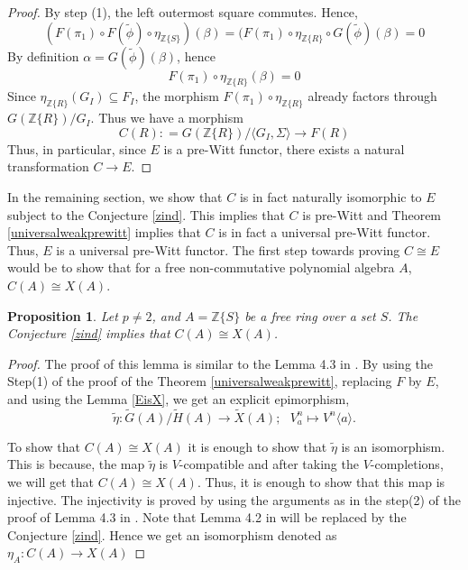 \documentclass[11pt]{amsart}
\theoremstyle{plain}
\newtheorem{proposition}[thm]{Proposition}
\theoremstyle{definition}
\renewcommand{\tilde}{\widetilde}
\newcommand{\Z}{{\mathbb Z}}
\newcommand{\ab}[1]{\langle {#1} \rangle}
\newcommand{\ac}[1]{\{#1\}}
\begin{document}
\begin{proof}
\noindent By step (1), the left outermost square commutes. Hence,
$$(F(\pi_1) \circ F(\tilde{\phi}) \circ \eta_{\Z\{S\}})(\beta) = (F(\pi_1) \circ \eta_{\Z\{R\}} \circ G(\tilde{\phi})(\beta) = 0 $$
By definition $\alpha = G(\tilde{\phi})(\beta)$, hence 
$$F(\pi_1) \circ \eta_{\Z\{R\}}(\beta) = 0 $$
Since $\eta_{\Z\{R\}}(G_I) \subseteq F_I$, the morphism $F(\pi_1) \circ \eta_{\Z\{R\}}$ already factors through $G(\Z\{R\})/G_I$. Thus we have a morphism 
$$C(R) : = G(\Z\{R\})/\langle G_I, \Sigma\rangle \to F(R)$$
Thus, in particular, since $E$ is a pre-Witt functor, there exists a natural transformation $C \to E$. 
\end{proof}

In the remaining section, we show that $C$ is in fact naturally isomorphic to $E$ subject to the Conjecture \ref{zind}. This implies that  $C$ is pre-Witt and Theorem \ref{universalweakprewitt} implies that $C$ is in fact a universal pre-Witt functor. Thus, $E$ is a universal pre-Witt functor. The first step towards proving $C \cong E$ would be to show that for a free non-commutative polynomial algebra $A$, $C(A) \cong X(A)$.  

\begin{proposition}\label{C(A)isX(A)} Let $p \neq 2$, and $A=\Z\ac{S}$ be a free ring over a set $S$. The Conjecture \ref{zind} implies that $C(A) \cong X(A)$. 
\end{proposition}
\begin{proof}
The proof of this lemma is similar to the Lemma 4.3 in \cite{ps}.
\vspace{2mm}
By using the Step(1) of the proof of the Theorem \ref{universalweakprewitt},  replacing $F$ by $E$, and using the Lemma \ref{EisX}, we get an explicit epimorphism, 
$$\tilde{\eta}:  \tilde{G}(A)/\tilde{H}(A) \to \tilde{X}(A);  \  \ \ V^n_a \mapsto V^n\ab{a} .$$
 
To show that $C(A) \cong X(A)$ it is enough to show that $\tilde{\eta}$ is an isomorphism. This is because, the map $\tilde{\eta}$ is $V$-compatible and after taking the $V$-completions, we will get that $C(A) \cong X(A)$. Thus, it is enough to show that this map is injective. The injectivity is proved by using the arguments as in the step(2) of the proof of Lemma 4.3 in \cite{ps}. Note that Lemma 4.2 in \cite{ps} will be replaced by the Conjecture \ref{zind}. Hence we get an isomorphism denoted as $\eta_{A}: C(A) \to X(A)$
\end{proof}
\end{document}
